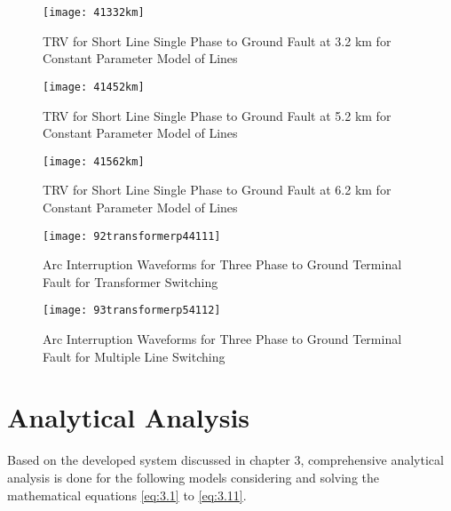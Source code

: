 \begin{sidewaysfigure}
   \centering 
   \texttt{[image: 41332km]} 
   \caption{TRV for Short Line Single Phase to Ground Fault at 3.2 km for Constant Parameter Model of Lines}
   \label{Fig:4.1.13} 
\end{sidewaysfigure}

\begin{sidewaysfigure}
   \centering 
   \texttt{[image: 41452km]} 
   \caption{TRV for Short Line Single Phase to Ground Fault at 5.2 km for Constant Parameter Model of Lines}
   \label{Fig:4.1.14} 
\end{sidewaysfigure}

\begin{sidewaysfigure}
   \centering 
   \texttt{[image: 41562km]} 
   \caption{TRV for Short Line Single Phase to Ground Fault at 6.2 km for Constant Parameter Model of Lines}
   \label{Fig:4.1.15} 
\end{sidewaysfigure}

\begin{sidewaysfigure}
   \centering 
   \texttt{[image: 92transformerp44111]} 
   \caption{Arc Interruption Waveforms for Three Phase to Ground Terminal Fault for Transformer Switching}
   \label{Fig:4.1.16} 
\end{sidewaysfigure}


\begin{sidewaysfigure}
   \centering 
   \texttt{[image: 93transformerp54112]} 
   \caption{Arc Interruption Waveforms for Three Phase to Ground Terminal Fault for Multiple Line Switching}
   \label{Fig:4.1.17} 
\end{sidewaysfigure}

\clearpage

\section{Analytical Analysis}
Based on the developed system discussed in chapter 3, comprehensive analytical analysis is done for the following models considering and solving the mathematical equations \ref{eq:3.1} to \ref{eq:3.11}.

